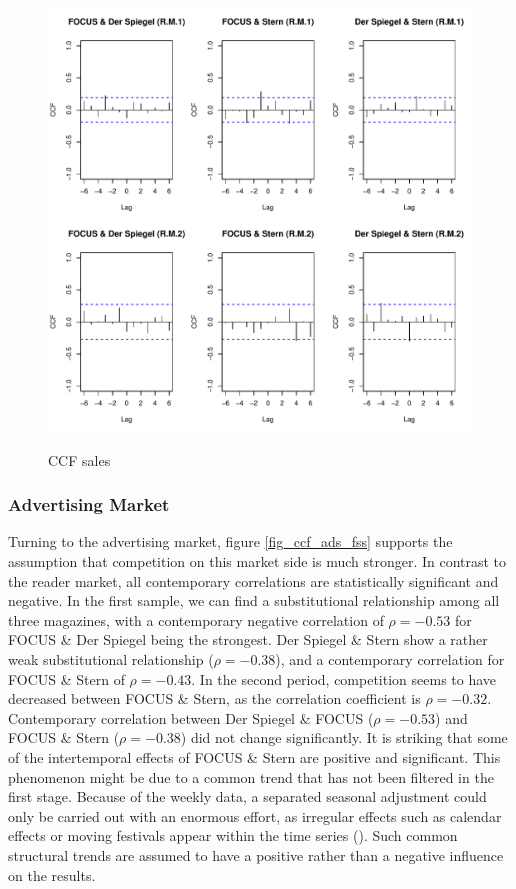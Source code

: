 \documentclass[12pt,a4paper,notitlepage]{article}
\begin{document}
\begin{figure}[H]
\caption{CCF sales}
	\centering
	\includegraphics[scale=0.5]{../figs/ccf_sales_fss}
	\label{fig_ccf_sales_fss}
\end{figure}

\subsubsection{Advertising Market}
Turning to the advertising market, figure \ref{fig_ccf_ads_fss} supports the assumption that competition on this market side is much stronger. In contrast to the reader market, all contemporary correlations are statistically significant and negative. In the first sample, we can find a substitutional relationship among all three magazines, with a contemporary negative correlation of $\rho=-0.53$ for FOCUS \& Der Spiegel being the strongest. Der Spiegel \& Stern show a rather weak substitutional relationship ($\rho=-0.38$), and a contemporary correlation for FOCUS \& Stern of $\rho=-0.43$. In the second period, competition seems to have decreased between FOCUS \& Stern, as the correlation coefficient is $\rho=-0.32$. Contemporary correlation between Der Spiegel \& FOCUS ($\rho=-0.53$) and FOCUS \& Stern ($\rho=-0.38$) did not change significantly. It is striking that some of the intertemporal effects of FOCUS \& Stern are positive and significant. This phenomenon might be due to a common trend that has not been filtered in the first stage. Because of the weekly data, a separated seasonal adjustment could only be carried out with an enormous effort, as irregular effects such as calendar effects or moving festivals appear within the time series (\cite{harvey_modeling_1997}). Such common structural trends are assumed to have a positive rather than a negative influence on the results. 
\end{document}
